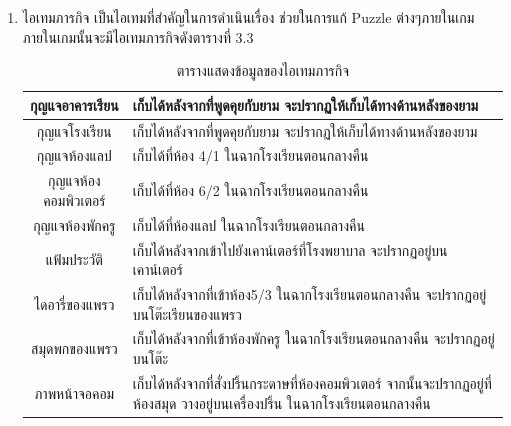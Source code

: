 \begin{enumerate}
    \item ไอเทมภารกิจ เป็นไอเทมที่สำคัญในการดำเนินเรื่อง ช่วยในการแก้ Puzzle ต่างๆภายในเกม ภายในเกมนั้นจะมีไอเทมภารกิจดังตารางที่ 3.3
    \begin{table}[h]
        \centering
        \begin{tabular}{|c|p{8cm}|}
            \hline
            กุญแจอาคารเรียน & เก็บได้หลังจากที่พูดคุยกับยาม จะปรากฏให้เก็บได้ทางด้านหลังของยาม \\
            \hline
            กุญแจโรงเรียน & เก็บได้หลังจากที่พูดคุยกับยาม จะปรากฏให้เก็บได้ทางด้านหลังของยาม \\
            \hline
            กุญแจห้องแลป & เก็บได้ที่ห้อง 4/1 ในฉากโรงเรียนตอนกลางคืน\\
            \hline
            กุญแจห้องคอมพิวเตอร์ & เก็บได้ที่ห้อง 6/2 ในฉากโรงเรียนตอนกลางคืน\\
            \hline
            กุญแจห้องพักครู & เก็บได้ที่ห้องแลป ในฉากโรงเรียนตอนกลางคืน\\
            \hline
            แฟ้มประวัติ & เก็บได้หลังจากเข้าไปยังเคาน์เตอร์ที่โรงพยาบาล จะปรากฏอยู่บนเคาน์เตอร์\\
            \hline
            ไดอารี่ของแพรว & เก็บได้หลังจากที่เข้าห้อง5/3 ในฉากโรงเรียนตอนกลางคืน จะปรากฏอยู่บนโต๊ะเรียนของแพรว\\
            \hline
            สมุดพกของแพรว & เก็บได้หลังจากที่เข้าห้องพักครู ในฉากโรงเรียนตอนกลางคืน จะปรากฏอยู่บนโต๊ะ\\
            \hline
            ภาพหน้าจอคอม & เก็บได้หลังจากที่สั่งปริ้นกระดาษที่ห้องคอมพิวเตอร์ จากนั้นจะปรากฏอยู่ที่ห้องสมุด วางอยู่บนเครื่องปริ้น ในฉากโรงเรียนตอนกลางคืน\\
            \hline
        \end{tabular}
        \caption[ตารางแสดงข้อมูลของไอเทมภารกิจ]{ตารางแสดงข้อมูลของไอเทมภารกิจ}
    \end{table}
\end{enumerate}

\newpage
